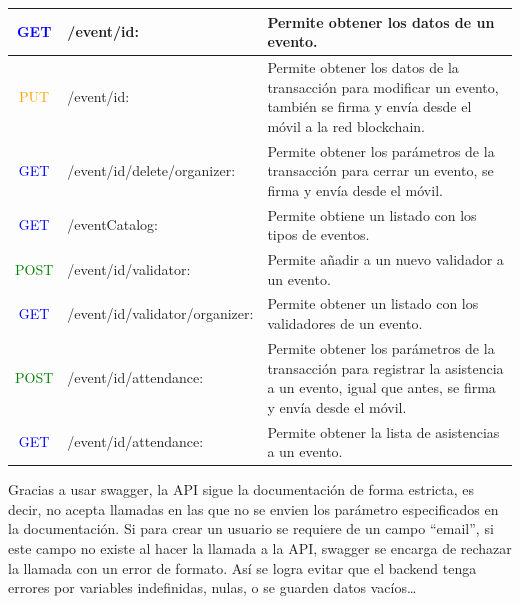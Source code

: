 \begin{center}
\begin{tabular}{|c|l|m{23em}|}
    \hline
    \textcolor{blue}{{\footnotesize GET}} & /event/{id}: & Permite obtener los datos de un evento. \\
    \hline
    \textcolor{orange}{{\footnotesize PUT}} & /event/{id}: & Permite obtener los datos de la transacción para modificar un evento, también se firma y envía desde el móvil a la red blockchain.  \\
    \hline
    \textcolor{blue}{{\footnotesize GET}} & /event/{id}/delete/{organizer}: & Permite obtener los parámetros de la transacción para cerrar un evento, se firma y envía desde el móvil. \\
    \hline
    \textcolor{blue}{{\footnotesize GET}} & /eventCatalog: & Permite obtiene un listado con los tipos de eventos.  \\
    \hline
    \textcolor{green}{{\footnotesize POST}} & /event/{id}/validator: & Permite añadir a un nuevo validador a un evento. \\
    \hline
    \textcolor{blue}{{\footnotesize GET}} & /event/{id}/validator/{organizer}: & Permite obtener un listado con los validadores de un evento.  \\
    \hline
    \textcolor{green}{{\footnotesize POST}} & /event/{id}/attendance: & Permite obtener los parámetros de la transacción para registrar la asistencia a un evento, igual que antes, se firma y envía desde el móvil.  \\
    \hline
    \textcolor{blue}{{\footnotesize GET}} & /event/{id}/attendance: & Permite obtener la lista de asistencias a un evento.  \\
    \hline
  \end{tabular}
\end{center}

Gracias a usar swagger, la API sigue la documentación de forma estricta, es decir, no acepta llamadas en las que no se envien los parámetro especificados en la documentación. Si para crear un usuario se requiere de un campo ``email'', si este campo no existe al hacer la llamada a la API, swagger se encarga de rechazar la llamada con un error de formato. Así se logra evitar que el backend tenga errores por variables indefinidas, nulas, o se guarden datos vacíos\dots

